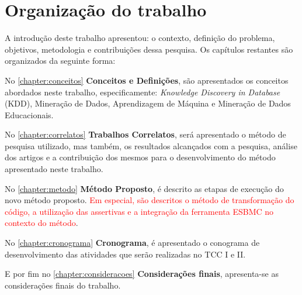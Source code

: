 

\section{Organização do trabalho}
A introdução deste trabalho apresentou: o contexto, definição do problema, objetivos, metodologia e contribuições dessa pesquisa. Os capítulos restantes são organizados da seguinte forma:

\par
No \autoref{chapter:conceitos} \textbf{Conceitos e Definições}, são apresentados os conceitos abordados neste trabalho, especificamente: \textit{Knowledge Discovery in Database} (KDD), Mineração de Dados, Aprendizagem de Máquina e Mineração de Dados Educacionais.

\par
No \autoref{chapter:correlatos} \textbf{Trabalhos Correlatos}, será apresentado o método de pesquisa utilizado, mas também, os resultados alcançados com a pesquisa, análise dos artigos e a contribuição dos mesmos para o desenvolvimento do método apresentado neste trabalho.

\par
No \autoref{chapter:metodo} \textbf{Método Proposto}, é descrito as etapas de execução do novo método proposto. \textcolor{red}{Em especial, são descritos o método de transformação do código, a utilização das assertivas e a integração da ferramenta ESBMC no contexto do método}.

\par
No \autoref{chapter:cronograma} \textbf{Cronograma}, é apresentado o conograma de desenvolvimento das atividades que serão realizadas no TCC I e II. %
\par
E por fim no \autoref{chapter:consideracoes} \textbf{Considerações finais}, apresenta-se as considerações finais do trabalho. 
